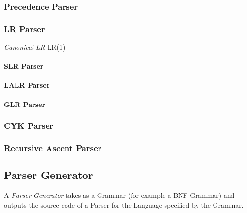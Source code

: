 \subsubsection{Precedence Parser}\label{sec:precedence_parser}

\subsubsection{LR Parser}\label{sec:lr_parser}

\emph{Canonical LR} LR(1)

\paragraph{SLR Parser}\label{sec:slr_parser}

\paragraph{LALR Parser}\label{sec:lalr_parser}

\paragraph{GLR Parser}\label{sec:glr_parser}



\subsubsection{CYK Parser}\label{sec:cyk_parser}

\subsubsection{Recursive Ascent Parser}\label{sec:recursive_ascent}



\subsection{Parser Generator}\label{sec:parser_generator}

A \emph{Parser Generator} takes as a Grammar (for example a BNF
Grammar) and outputs the source code of a Parser for the Language
specified by the Grammar.



